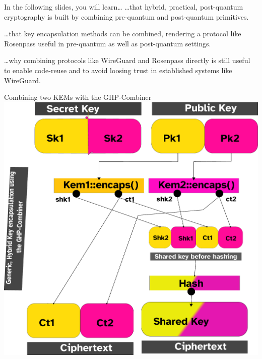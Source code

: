 
\begin{frame}{In the following slides, you will learn…}
\hypertarget{you-will-learn-hybrid}{}
  …that hybrid, practical, post-quantum cryptography is built by combining pre-quantum and post-quantum primitives.

  \vspace{2em}
  …that key encapsulation methods can be combined, rendering a protocol like Rosenpass useful in pre-quantum as well
  as post-quantum settings.

  \vspace{2em}
  …why combining protocols like WireGuard and Rosenpass directly is still useful to enable code-reuse and to avoid
  loosing trust in established systems like WireGuard.
\end{frame}

\begin{frame}{Combining two KEMs with the GHP-Combiner}
  \hypertarget{ghp-combiner}{}
  \centering
  \includegraphics[height=.85\textheight]{graphics/ghp-combiner.pdf}
\end{frame}


